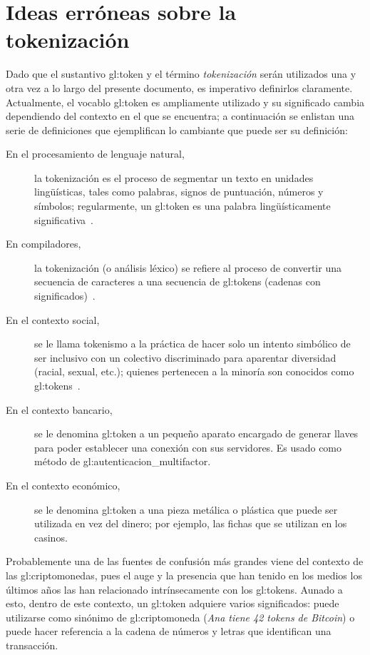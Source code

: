 %
%
%

\section{Ideas erróneas sobre la tokenización}

Dado que el sustantivo \gls{gl:token} y el término \textit{tokenización} serán
utilizados una y otra vez a lo largo del presente documento, es imperativo
definirlos claramente. Actualmente, el vocablo \gls{gl:token} es ampliamente
utilizado y su significado cambia dependiendo del contexto en el que se
encuentra; a continuación se enlistan una serie de definiciones que
ejemplifican lo cambiante que puede ser su definición:
\begin{description}
  \item [En el procesamiento de lenguaje natural,] la tokenización es el proceso
    de segmentar un texto en unidades lingüísticas, tales como palabras, signos
    de puntuación, números y símbolos; regularmente, un \gls{gl:token} es una
    palabra lingüísticamente significativa~\cite{miscon_nlp}.
  \item [En compiladores,] la tokenización (o análisis léxico) se refiere al
    proceso de convertir una secuencia de caracteres a una secuencia de
    \glspl{gl:token} (cadenas con significados)~\cite{miscon_comp}.
  \item [En el contexto social,] se le llama tokenismo a la práctica de hacer
    solo un intento simbólico de ser inclusivo con un colectivo discriminado
    para aparentar diversidad (racial, sexual, etc.); quienes pertenecen a la
    minoría son conocidos como \glspl{gl:token}~\cite{miscon_soc}.
  \item [En el contexto bancario,] se le denomina \gls{gl:token} a un pequeño
    aparato encargado de generar llaves para poder establecer una conexión con
    sus servidores. Es usado como método de \gls{gl:autenticacion_multifactor}.
  \item [En el contexto económico,] se le denomina \gls{gl:token} a una pieza
    metálica o plástica que puede ser utilizada en vez del dinero; por ejemplo,
    las fichas que se utilizan en los casinos.
\end{description}
Probablemente una de las fuentes de confusión más grandes viene del contexto
de las \glspl{gl:criptomoneda}, pues el auge y la presencia que han tenido en
los medios los últimos años las han relacionado intrínsecamente con los
\glspl{gl:token}. Aunado a esto, dentro de este contexto, un \gls{gl:token}
adquiere varios significados: puede utilizarse como sinónimo de
\gls{gl:criptomoneda} (\textit{Ana tiene 42 tokens de Bitcoin}) o puede hacer
referencia a la cadena de números y letras que identifican una transacción.

